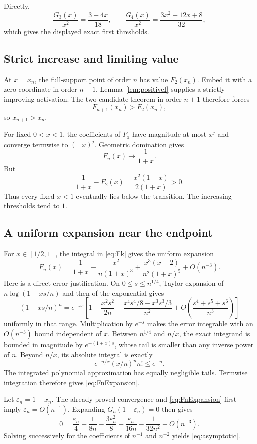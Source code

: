 \documentclass[11pt]{article}
\theoremstyle{definition}\newtheorem{definition}[theorem]{Definition}
\theoremstyle{remark}\newtheorem{remark}[theorem]{Remark}
\begin{document}
Directly,
\[
 \frac{G_3(x)}{x^2}=\frac{3-4x}{18},\qquad
 \frac{G_4(x)}{x^2}=\frac{3x^2-12x+8}{32},
\]
which gives the displayed exact first thresholds.

\subsection{Strict increase and limiting value}
At $x=x_n$, the full-support point of order $n$ has value $F_2(x_n)$. Embed it with a zero coordinate in order $n+1$. Lemma~\ref{lem:positiveI} supplies a strictly improving activation. The two-candidate theorem in order $n+1$ therefore forces
\[
 F_{n+1}(x_n)>F_2(x_n),
\]
so $x_{n+1}>x_n$.

For fixed $0<x<1$, the coefficients of $F_n$ have magnitude at most $x^j$ and converge termwise to $(-x)^j$. Geometric domination gives
\[
 F_n(x)\longrightarrow\frac1{1+x}.
\]
But
\[
 \frac1{1+x}-F_2(x)=\frac{x^2(1-x)}{2(1+x)}>0.
\]
Thus every fixed $x<1$ eventually lies below the transition. The increasing thresholds tend to $1$.

\subsection{A uniform expansion near the endpoint}
For $x\in[1/2,1]$, the integral in \eqref{eq:Fk} gives the uniform expansion
\begin{equation}\label{eq:FnExpansion}
 F_n(x)=\frac1{1+x}-\frac{x^2}{n(1+x)^3}
       +\frac{x^3(x-2)}{n^2(1+x)^5}+O(n^{-3}).
\end{equation}
Here is a direct error justification. On $0\leq s\leq n^{1/4}$, Taylor expansion of $n\log(1-xs/n)$ and then of the exponential gives
\[
 (1-xs/n)^n=e^{-xs}\left[
 1-\frac{x^2s^2}{2n}
 +\frac{x^4s^4/8-x^3s^3/3}{n^2}
 +O\!\left(\frac{s^4+s^5+s^6}{n^3}\right)\right]
\]
uniformly in that range. Multiplication by $e^{-s}$ makes the error integrable with an $O(n^{-3})$ bound independent of $x$. Between $n^{1/4}$ and $n/x$, the exact integrand is bounded in magnitude by $e^{-(1+x)s}$, whose tail is smaller than any inverse power of $n$. Beyond $n/x$, its absolute integral is exactly
\[
 e^{-n/x}(x/n)^n n!\leq e^{-n}.
\]
The integrated polynomial approximation has equally negligible tails. Termwise integration therefore gives \eqref{eq:FnExpansion}.

Let $\varepsilon_n=1-x_n$. The already-proved convergence and \eqref{eq:FnExpansion} first imply $\varepsilon_n=O(n^{-1})$. Expanding $G_n(1-\varepsilon_n)=0$ then gives
\[
 0=\frac{\varepsilon_n}{4}-\frac1{8n}
     -\frac{3\varepsilon_n^2}{8}
     +\frac{\varepsilon_n}{16n}-\frac1{32n^2}
     +O(n^{-3}).
\]
Solving successively for the coefficients of $n^{-1}$ and $n^{-2}$ yields \eqref{eq:asymptotic}.
\end{document}
